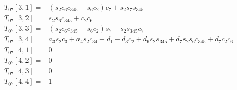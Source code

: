 \documentclass{article}
\begin{document}
\begin{align}
T_{07}[3, 1] =& \left(s_{2} c_{6} c_{345} - s_{6} c_{2}\right) c_{7} + s_{2} s_{7} s_{345} \nonumber \\
T_{07}[3, 2] =& s_{2} s_{6} c_{345} + c_{2} c_{6} \nonumber \\
T_{07}[3, 3] =& \left(s_{2} c_{6} c_{345} - s_{6} c_{2}\right) s_{7} - s_{2} s_{345} c_{7} \nonumber \\
T_{07}[3, 4] =& a_{3} s_{2} c_{3} + a_{4} s_{2} c_{34} + d_{1} - d_{3} c_{2} + d_{6} s_{2} s_{345} + d_{7} s_{2} s_{6} c_{345} + d_{7} c_{2} c_{6} \nonumber \\
T_{07}[4, 1] =& 0 \nonumber \\
T_{07}[4, 2] =& 0 \nonumber \\
T_{07}[4, 3] =& 0 \nonumber \\
T_{07}[4, 4] =& 1 \nonumber
\end{align}
\end{document}
